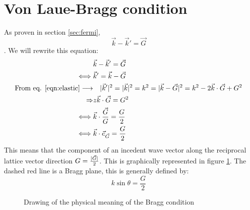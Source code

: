 \section{Von Laue-Bragg condition} \label{sec:bragg}
As proven in section \ref{sec:fermi}, \begin{equation} \vec{k} - \vec{k}' = \vec{G} \end{equation}. We will rewrite this equation:
\begin{align}
	&\vec{k} - \vec{k}' = \vec{G}\\
	\iff&\vec{k}' = \vec{k} - \vec{G}\\
	\text{From eq. \ref{eqn:elastic}}\longrightarrow&\quad\lvert\vec{k}'\rvert^2 = \lvert\vec{k}\rvert^2 = k^2 = \lvert\vec{k} - \vec{G}\rvert^2 = k^2 - 2\vec{k}\cdot\vec{G} + G^2\\
	\Rightarrow & z\vec{k}\cdot\vec{G} = G^2\\
	\iff& \vec{k}\cdot\frac{\vec{G}}{G} = \frac{G}{2}\\
	\iff&\vec{k}\cdot\vec{e}_{\vec{G}} = \frac{G}{2}\label{eqn:braggplane_derivation}
\end{align}
This means that the component of an incedent wave vector along the reciprocal lattice vector direction $G = \frac{\lvert\vec{G}\rvert}{2}$. This is graphically represented in figure \ref{fig:halfdistance}. The dashed red line is a Bragg plane, this is generally defined by: \begin{equation} k\sin\theta = \frac{G}{2} \label{eqn:braggtheta}\end{equation}
\begin{figure}
	\centering
	\caption{Drawing of the physical meaning of the Bragg condition}
	\label{fig:halfdistance}
\end{figure}
